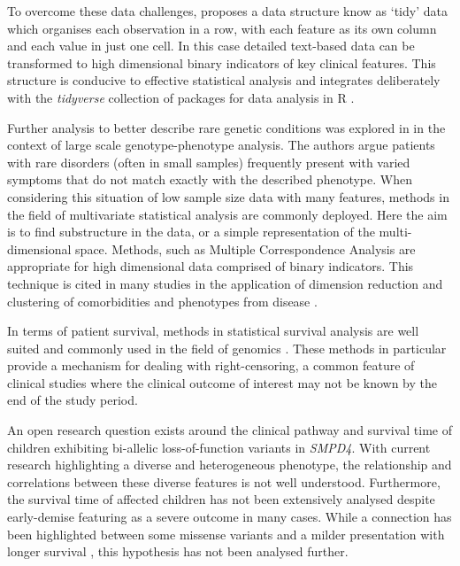 \documentclass[
  authoryear,
  preprint,
  3p]{elsarticle}
\begin{document}
To overcome these data challenges, \citet{JSSv059i10} proposes a data
structure know as `tidy' data which organises each observation in a row,
with each feature as its own column and each value in just one cell. In
this case detailed text-based data can be transformed to high
dimensional binary indicators of key clinical features. This structure
is conducive to effective statistical analysis and integrates
deliberately with the \emph{tidyverse} \citep{tidyverse} collection of
packages for data analysis in R \citep{rbase}.

Further analysis to better describe rare genetic conditions was explored
in \citet{diaz2020phenotype} in the context of large scale
genotype-phenotype analysis. The authors argue patients with rare
disorders (often in small samples) frequently present with varied
symptoms that do not match exactly with the described phenotype. When
considering this situation of low sample size data with many features,
methods in the field of multivariate statistical analysis are commonly
deployed. Here the aim is to find substructure in the data, or a simple
representation of the multi-dimensional space. Methods, such as Multiple
Correspondence Analysis \citep{le2010multiple} are appropriate for high
dimensional data comprised of binary indicators. This technique is cited
in many studies in the application of dimension reduction and clustering
of comorbidities and phenotypes from disease
\citep{han2018cluster, costa2013use}.

In terms of patient survival, methods in statistical survival analysis
are well suited and commonly used in the field of genomics
\citep{chen2014survival}. These methods in particular provide a
mechanism for dealing with right-censoring, a common feature of clinical
studies where the clinical outcome of interest may not be known by the
end of the study period.

An open research question exists around the clinical pathway and
survival time of children exhibiting bi-allelic loss-of-function
variants in \emph{SMPD4}. With current research highlighting a diverse
and heterogeneous phenotype, the relationship and correlations between
these diverse features is not well understood. Furthermore, the survival
time of affected children has not been extensively analysed despite
early-demise featuring as a severe outcome in many cases. While a
connection has been highlighted between some missense variants and a
milder presentation with longer survival \citep{magini2019loss}, this
hypothesis has not been analysed further.
\end{document}
